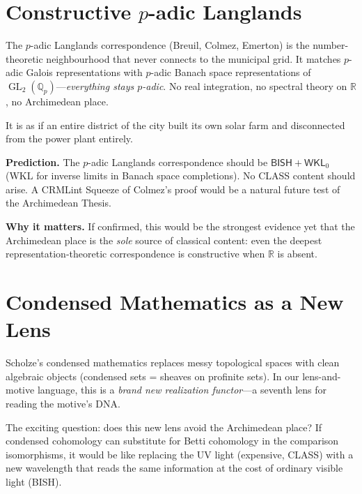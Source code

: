 \documentclass[11pt,twoside,openany]{report}
\theoremstyle{remark}
\newcommand{\BISH}{\textsf{BISH}}
\newcommand{\CLASS}{\textsf{CLASS}}
\DeclareMathOperator{\GL}{GL}
\begin{document}
\section{Constructive $p$-adic Langlands}

\begin{analogybox}
The $p$-adic Langlands correspondence (Breuil, Colmez, Emerton) is the number-theoretic neighbourhood that never connects to the municipal grid. It matches $p$-adic Galois representations with $p$-adic Banach space representations of $\GL_2(\mathbb{Q}_p)$---\emph{everything stays $p$-adic}. No real integration, no spectral theory on $\mathbb{R}$, no Archimedean place.

It is as if an entire district of the city built its own solar farm and disconnected from the power plant entirely.
\end{analogybox}

\textbf{Prediction.} The $p$-adic Langlands correspondence should be $\BISH + \textsf{WKL}_0$ (WKL for inverse limits in Banach space completions). No \CLASS{} content should arise. A CRMLint Squeeze of Colmez's proof would be a natural future test of the Archimedean Thesis.

\textbf{Why it matters.} If confirmed, this would be the strongest evidence yet that the Archimedean place is the \emph{sole} source of classical content: even the deepest representation-theoretic correspondence is constructive when $\mathbb{R}$ is absent.


\section{Condensed Mathematics as a New Lens}

\begin{analogybox}
Scholze's condensed mathematics replaces messy topological spaces with clean algebraic objects (condensed sets = sheaves on profinite sets). In our lens-and-motive language, this is a \emph{brand new realization functor}---a seventh lens for reading the motive's DNA.

The exciting question: does this new lens avoid the Archimedean place? If condensed cohomology can substitute for Betti cohomology in the comparison isomorphisms, it would be like replacing the UV light (expensive, \CLASS) with a new wavelength that reads the same information at the cost of ordinary visible light (\BISH).
\end{analogybox}
\end{document}
